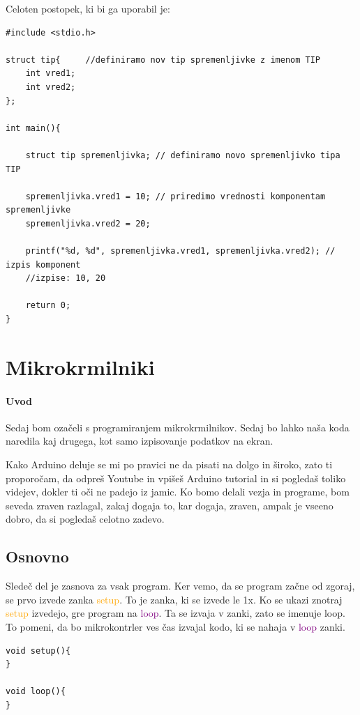 \documentclass[a4paper, 12pt]{article}
\begin{document}
Celoten postopek, ki bi ga uporabil je:

\begin{lstlisting}
#include <stdio.h>

struct tip{ 	//definiramo nov tip spremenljivke z imenom TIP 
	int vred1;
	int vred2;
};

int main(){
	
	struct tip spremenljivka; // definiramo novo spremenljivko tipa TIP
	
	spremenljivka.vred1 = 10; // priredimo vrednosti komponentam spremenljivke
	spremenljivka.vred2 = 20;
	
	printf("%d, %d", spremenljivka.vred1, spremenljivka.vred2); // izpis komponent
	//izpise: 10, 20

	return 0;
}
\end{lstlisting}

\pagebreak

\section{Mikrokrmilniki}

\paragraph{Uvod}Sedaj bom ozačeli s programiranjem mikrokrmilnikov. Sedaj bo lahko naša koda naredila kaj drugega, kot samo izpisovanje podatkov na ekran.\

Kako Arduino deluje se mi po pravici ne da pisati na dolgo in široko, zato ti proporočam, da odpreš Youtube in vpišeš Arduino tutorial in si pogledaš toliko videjev, dokler ti oči ne padejo iz jamic. Ko bomo delali vezja in programe, bom seveda zraven razlagal, zakaj dogaja to, kar dogaja, zraven, ampak je vseeno dobro, da si pogledaš celotno zadevo.\

\subsection{Osnovno}
Sledeč del je zasnova za vsak program. Ker vemo, da se program začne od zgoraj, se prvo izvede zanka \textcolor{orange}{setup}. To je zanka, ki se izvede le 1x. Ko se ukazi znotraj \textcolor{orange}{setup} izvedejo, gre program na \textcolor{purple}{loop}. Ta se izvaja v zanki, zato se imenuje loop. To pomeni, da bo mikrokontrler ves čas izvajal kodo, ki se nahaja v  \textcolor{purple}{loop} zanki.
\begin{lstlisting}
void setup(){
}

void loop(){
}
\end{lstlisting}
\end{document}
